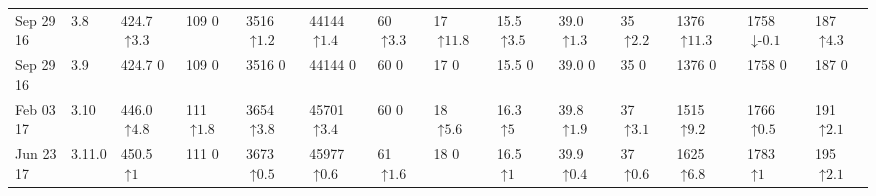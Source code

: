 \begin{tabular}{ll|llllll|lll|lll}
Sep 29 16 & 3.8 & 424.7 {\tiny $\uparrow\text{3.3}$} & 109 {\tiny $\text{0}$} & 3516 {\tiny $\uparrow\text{1.2}$} & 44144 {\tiny $\uparrow\text{1.4}$} & 60 {\tiny $\uparrow\text{3.3}$} & 17 {\tiny $\uparrow\text{11.8}$} & 15.5 {\tiny $\uparrow\text{3.5}$} & 39.0 {\tiny $\uparrow\text{1.3}$} & 35 {\tiny $\uparrow\text{2.2}$} & 1376 {\tiny $\uparrow\text{11.3}$} & 1758 {\tiny $\downarrow\text{-}\text{0.1}$} & 187 {\tiny $\uparrow\text{4.3}$} \\
Sep 29 16 & 3.9 & 424.7 {\tiny $\text{0}$} & 109 {\tiny $\text{0}$} & 3516 {\tiny $\text{0}$} & 44144 {\tiny $\text{0}$} & 60 {\tiny $\text{0}$} & 17 {\tiny $\text{0}$} & 15.5 {\tiny $\text{0}$} & 39.0 {\tiny $\text{0}$} & 35 {\tiny $\text{0}$} & 1376 {\tiny $\text{0}$} & 1758 {\tiny $\text{0}$} & 187 {\tiny $\text{0}$} \\
Feb 03 17 & 3.10 & 446.0 {\tiny $\uparrow\text{4.8}$} & 111 {\tiny $\uparrow\text{1.8}$} & 3654 {\tiny $\uparrow\text{3.8}$} & 45701 {\tiny $\uparrow\text{3.4}$} & 60 {\tiny $\text{0}$} & 18 {\tiny $\uparrow\text{5.6}$} & 16.3 {\tiny $\uparrow\text{5}$} & 39.8 {\tiny $\uparrow\text{1.9}$} & 37 {\tiny $\uparrow\text{3.1}$} & 1515 {\tiny $\uparrow\text{9.2}$} & 1766 {\tiny $\uparrow\text{0.5}$} & 191 {\tiny $\uparrow\text{2.1}$} \\
Jun 23 17 & 3.11.0 & 450.5 {\tiny $\uparrow\text{1}$} & 111 {\tiny $\text{0}$} & 3673 {\tiny $\uparrow\text{0.5}$} & 45977 {\tiny $\uparrow\text{0.6}$} & 61 {\tiny $\uparrow\text{1.6}$} & 18 {\tiny $\text{0}$} & 16.5 {\tiny $\uparrow\text{1}$} & 39.9 {\tiny $\uparrow\text{0.4}$} & 37 {\tiny $\uparrow\text{0.6}$} & 1625 {\tiny $\uparrow\text{6.8}$} & 1783 {\tiny $\uparrow\text{1}$} & 195 {\tiny $\uparrow\text{2.1}$} \\
\bottomrule
\end{tabular}
\label{tab:deps_cas}